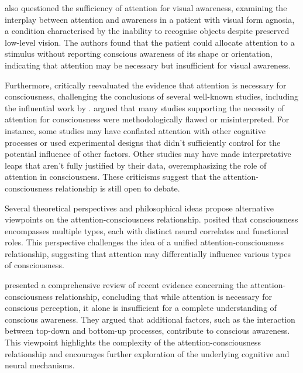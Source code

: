 \documentclass[10pt]{article}
\begin{document}
\begin{sloppypar}
  \cite{kentridge_attended_2008} also questioned the sufficiency of attention for visual awareness, examining the interplay between attention and awareness in a patient with visual form agnosia, a condition characterised by the inability to recognise objects despite preserved low-level vision. The authors found that the patient could allocate attention to a stimulus without reporting conscious awareness of its shape or orientation, indicating that attention may be necessary but insufficient for visual awareness.

  Furthermore, \cite{kozuch_gorillas_2018} critically reevaluated the evidence that attention is necessary for consciousness, challenging the conclusions of several well-known studies, including the influential work by \cite{cohen_attentional_2012}. \citeauthor*{kozuch_gorillas_2018} argued that many studies supporting the necessity of attention for consciousness were methodologically flawed or misinterpreted. For instance, some studies may have conflated attention with other cognitive processes or used experimental designs that didn't sufficiently control for the potential influence of other factors. Other studies may have made interpretative leaps that aren't fully justified by their data, overemphasizing the role of attention in consciousness. These criticisms suggest that the attention-consciousness relationship is still open to debate.


  Several theoretical perspectives and philosophical ideas propose alternative viewpoints on the attention-consciousness relationship. \cite{montemayor_types_2021} posited that consciousness encompasses multiple types, each with distinct neural correlates and functional roles. This perspective challenges the idea of a unified attention-consciousness relationship, suggesting that attention may differentially influence various types of consciousness.

  \cite{noah_recent_2020} presented a comprehensive review of recent evidence concerning the attention-consciousness relationship, concluding that while attention is necessary for conscious perception, it alone is insufficient for a complete understanding of conscious awareness. They argued that additional factors, such as the interaction between top-down and bottom-up processes, contribute to conscious awareness. This viewpoint highlights the complexity of the attention-consciousness relationship and encourages further exploration of the underlying cognitive and neural mechanisms.




\end{sloppypar}
\end{document}
